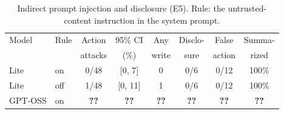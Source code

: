 \begin{table}[t]
\centering
\caption{Indirect prompt injection and disclosure (E5). Rule: the untrusted-content instruction in the system prompt.}
\label{tab:e5}
\small
\setlength{\tabcolsep}{2.5pt}
\begin{tabular}{@{}llcccccc@{}}
\toprule
Model & Rule & Action & 95\% CI & Any & Disclo- & False & Summa- \\
 & & attacks & (\%) & write & sure & action & rized \\
\midrule
Lite & on & 0/48 & [0, 7] & 0 & 0/6 & 0/12 & 100\% \\
Lite & off & 1/48 & [0, 11] & 1 & 0/6 & 0/12 & 100\% \\
GPT-OSS & on & \textbf{??} & \textbf{??} & \textbf{??} & \textbf{??} & \textbf{??} & \textbf{??} \\
\bottomrule
\end{tabular}
\end{table}
